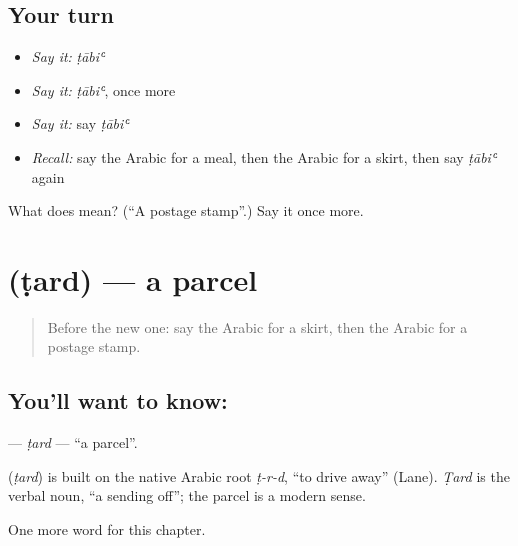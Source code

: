 \subsection*{Your turn}
\begin{itemize}
\raggedright
  \item \emph{Say it:} \emph{ṭābiʿ}
  \item \emph{Say it:} \emph{ṭābiʿ}, once more
  \item \emph{Say it:} say \emph{ṭābiʿ}
  \item \emph{Recall:} say the Arabic for a meal, then the Arabic for a skirt, then say \emph{ṭābiʿ} again
\end{itemize}

\begin{tcolorbox}[breakable,colback=teal!4,colframe=teal!35!black,title={Before you move on}]
What does  mean? (\textquotedblleft{}A postage stamp\textquotedblright{}.) Say it once more.
\end{tcolorbox}
\section[\texorpdfstring{\ar{طرد} (ṭard)}{طرد (ṭard)}]{ (ṭard) — a parcel}

\label{lesson:AR-C183-tard}



\begin{quote}
Before the new one: say the Arabic for a skirt, then the Arabic for a postage stamp.
\end{quote}

\subsection*{You'll want to know: }
\textbf{} — \emph{ṭard} — \textquotedblleft{}a parcel\textquotedblright{}.

\begin{cousinweb}
\textbf{} (\emph{ṭard}) is built on the native Arabic root \emph{ṭ-r-d}, \textquotedblleft{}to drive away\textquotedblright{} (Lane). \emph{Ṭard} is the verbal noun, \textquotedblleft{}a sending off\textquotedblright{}; the parcel is a modern sense.
\end{cousinweb}

\begin{grammarlens}[title={What you've built}]
One more word for this chapter.
\end{grammarlens}

